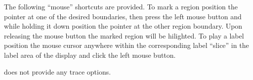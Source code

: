 The following ``mouse'' shortcuts are provided. To mark a region position the pointer at
one of the desired boundaries, then press the left mouse button and while holding it down
position the pointer at the other region boundary. Upon releasing the mouse button the 
marked region will be hilighted. To play a label position the mouse cursor anywhere within
the corresponding label ``slice'' in the label area of the display and click the left
mouse button.

 does not provide any trace options.


